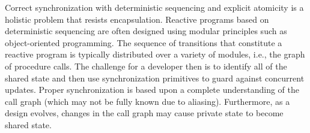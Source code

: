 Correct synchronization with deterministic sequencing and explicit atomicity is a holistic problem that resists encapsulation.
Reactive programs based on deterministic sequencing are often designed using modular principles such as object-oriented programming.
The sequence of transitions that constitute a reactive program is typically distributed over a variety of modules, i.e., the graph of procedure calls.
The challenge for a developer then is to identify all of the shared state and then use synchronization primitives to guard against concurrent updates.
Proper synchronization is based upon a complete understanding of the call graph (which may not be fully known due to aliasing).
Furthermore, as a design evolves, changes in the call graph may cause private state to become shared state.


